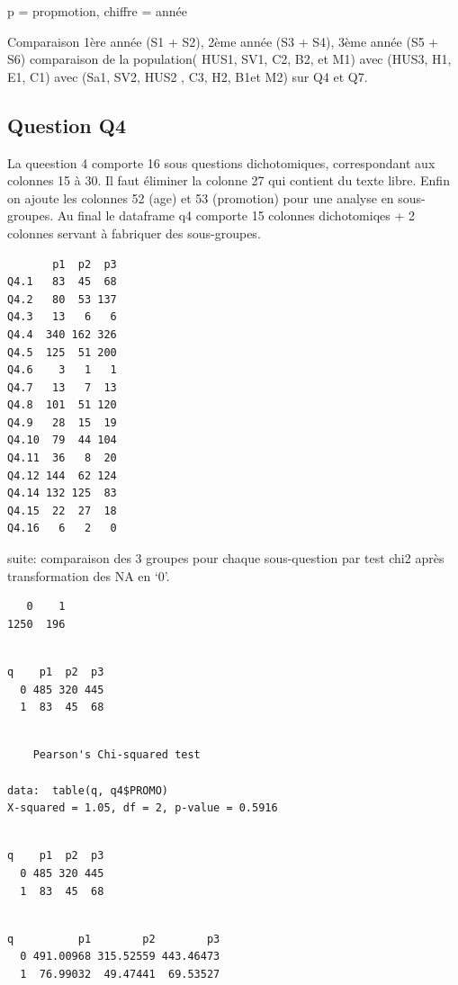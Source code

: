 \documentclass[]{article}
\begin{document}
p = propmotion, chiffre = année

Comparaison 1ère année (S1 + S2), 2ème année (S3 + S4), 3ème année (S5 +
S6) comparaison de la population( HUS1, SV1, C2, B2, et M1) avec (HUS3,
H1, E1, C1) avec (Sa1, SV2, HUS2 , C3, H2, B1et M2) sur Q4 et Q7.

\subsection{Question Q4}\label{question-q4}

La queestion 4 comporte 16 sous questions dichotomiques, correspondant
aux colonnes 15 à 30. Il faut éliminer la colonne 27 qui contient du
texte libre. Enfin on ajoute les colonnes 52 (age) et 53 (promotion)
pour une analyse en sous-groupes. Au final le dataframe q4 comporte 15
colonnes dichotomiqes + 2 colonnes servant à fabriquer des sous-groupes.

\begin{verbatim}
       p1  p2  p3
Q4.1   83  45  68
Q4.2   80  53 137
Q4.3   13   6   6
Q4.4  340 162 326
Q4.5  125  51 200
Q4.6    3   1   1
Q4.7   13   7  13
Q4.8  101  51 120
Q4.9   28  15  19
Q4.10  79  44 104
Q4.11  36   8  20
Q4.12 144  62 124
Q4.14 132 125  83
Q4.15  22  27  18
Q4.16   6   2   0
\end{verbatim}

suite: comparaison des 3 groupes pour chaque sous-question par test chi2
après transformation des NA en `0'.

\begin{verbatim}
   0    1 
1250  196 
\end{verbatim}

\begin{verbatim}
   
q    p1  p2  p3
  0 485 320 445
  1  83  45  68
\end{verbatim}

\begin{verbatim}

    Pearson's Chi-squared test

data:  table(q, q4$PROMO)
X-squared = 1.05, df = 2, p-value = 0.5916
\end{verbatim}

\begin{verbatim}
   
q    p1  p2  p3
  0 485 320 445
  1  83  45  68
\end{verbatim}

\begin{verbatim}
   
q          p1        p2        p3
  0 491.00968 315.52559 443.46473
  1  76.99032  49.47441  69.53527
\end{verbatim}
\end{document}
